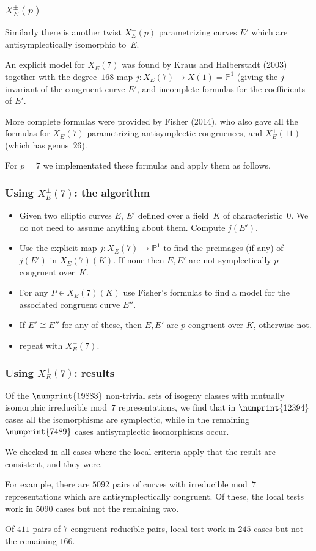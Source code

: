 \documentclass[compress]{beamer}
\newcommand{\PP}{\mathbb P}
\begin{document}
\begin{frame}\frametitle{$X_E^{\pm}(p)$}
Similarly there is another twist $X_E^-(p)$ parametrizing curves $E'$
which are antisymplectically isomorphic to~$E$.
    \pause
  \medskip

An explicit model for $X_E(7)$ was found by Kraus and Halberstadt
(2003) together with the degree~$168$ map $j:X_E(7)\to X(1)=\PP^1$
(giving the $j$-invariant of the congruent curve $E'$, and incomplete
formulas for the coefficients of $E'$.

    \pause
  \medskip
More complete formulas were provided by Fisher (2014), who also gave
all the formulas for $X_E^-(7)$ parametrizing antisymplectic
congruences, and $X_E^{\pm}(11)$ (which has genus~$26$).

    \pause
  \medskip
For $p=7$ we implementated these formulas and apply them as follows.
\end{frame}

\begin{frame}\frametitle{Using $X_E^{\pm}(7)$: the algorithm}
\begin{itemize}
\item Given two elliptic curves $E$, $E'$ defined over a field~$K$ of
  characteristic~$0$. We do not need to assume anything about them.
  Compute $j(E')$.
\item Use the explicit map $j:X_E(7)\to\PP^1$ to find the preimages
  (if any) of $j(E')$ in $X_E(7)(K)$.  If none then $E,E'$ are not
  symplectically $p$-congruent over~$K$.
\item For any $P\in X_E(7)(K)$ use Fisher's formulas to find a model
  for the associated congruent curve $E''$.
\item If $E'\cong E''$ for any of these, then $E,E'$ are $p$-congruent
  over $K$, otherwise not.
\item repeat with $X_E^-(7)$.
\end{itemize}
\end{frame}

\begin{frame}\frametitle{Using $X_E^{\pm}(7)$: results}
Of the $\numprint{19883}$ non-trivial sets of isogeny classes with mutually
isomorphic irreducible mod~$7$ representations, we find that in
$\numprint{12394}$ cases all the isomorphisms are symplectic, while in the
remaining $\numprint{7489}$ cases antisymplectic isomorphisms occur.

We checked in all cases where the local criteria apply that the result
are consistent, and they were.

For example, there are $5092$ pairs of curves with irreducible mod~$7$
representations which are antisymplectically congruent.  Of these, the
local tests work in $5090$ cases but not the remaining two.

Of $411$ pairs of $7$-congruent reducible pairs, local test work in
$245$ cases but not the remaining $166$.
\end{frame}
\end{document}
